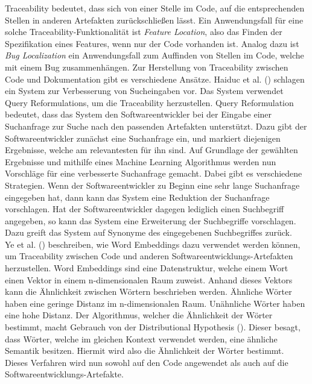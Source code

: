Traceability bedeutet, dass sich von einer Stelle im Code, auf die entsprechenden Stellen in anderen Artefakten zurückschließen lässt.
Ein Anwendungsfall für eine solche Traceability-Funktionalität ist \textit{Feature Location}, also das Finden der Spezifikation eines Features, wenn nur der Code vorhanden ist.
Analog dazu ist \textit{Bug Localization} ein Anwendungsfall zum Auffinden von Stellen im Code, welche mit einem Bug zusammenhängen.
Zur Herstellung von Traceability zwischen Code und Dokumentation gibt es verschiedene Ansätze.
Haiduc et al. (\citeyear{Haiduc_Bavota_Marcus_Oliveto_DeLucia_Menzies_2013}) schlagen ein System zur Verbesserung von Sucheingaben vor.
Das System verwendet Query Reformulations, um die Traceability herzustellen.
Query Reformulation bedeutet, dass das System den Softwareentwickler bei der Eingabe einer Suchanfrage zur Suche nach den passenden Artefakten unterstützt.
Dazu gibt der Softwareentwickler zunächst eine Suchanfrage ein, und markiert diejenigen Ergebnisse, welche am relevantesten für ihn sind.
Auf Grundlage der gewählten Ergebnisse und mithilfe eines Machine Learning Algorithmus werden nun Vorschläge für eine verbesserte Suchanfrage gemacht.
Dabei gibt es verschiedene Strategien.
Wenn der Softwareentwickler zu Beginn eine sehr lange Suchanfrage eingegeben hat, dann kann das System eine Reduktion der Suchanfrage vorschlagen.
Hat der Softwareentwickler dagegen lediglich einen Suchbegriff angegeben, so kann das System eine Erweiterung der Suchbegriffe vorschlagen.
Dazu greift das System auf Synonyme des eingegebenen Suchbegriffes zurück.\\

Ye et al. (\citeyear{Ye_Shen_Ma_Bunescu_Liu_2016}) beschreiben, wie Word Embeddings dazu verwendet werden können, um Traceability zwischen Code und anderen Softwareentwicklungs-Artefakten herzustellen.
Word Embeddings sind eine Datenstruktur, welche einem Wort einen Vektor in einem n-dimensionalen Raum zuweist.
Anhand dieses Vektors kann die Ähnlichkeit zwischen Wörtern beschrieben werden.
Ähnliche Wörter haben eine geringe Distanz im n-dimensionalen Raum.
Unähnliche Wörter haben eine hohe Distanz.
Der Algorithmus, welcher die Ähnlichkeit der Wörter bestimmt, macht Gebrauch von der Distributional Hypothesis (\cite{Harris_1954}).
Dieser besagt, dass Wörter, welche im gleichen Kontext verwendet werden, eine ähnliche Semantik besitzen.
Hiermit wird also die Ähnlichkeit der Wörter bestimmt.
Dieses Verfahren wird nun sowohl auf den Code angewendet als auch auf die Softwareentwicklungs-Artefakte.\\

